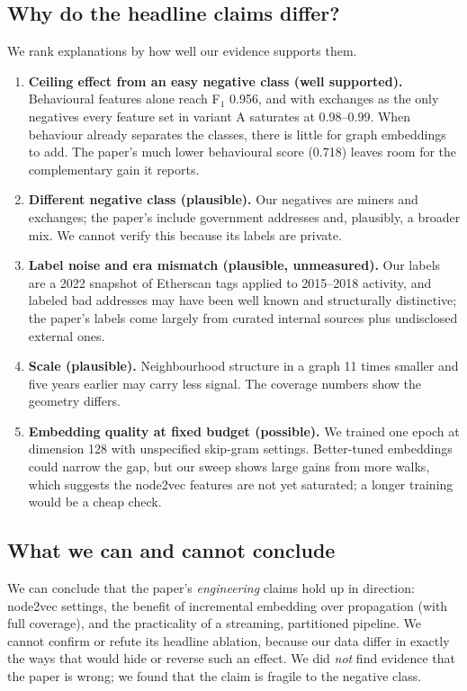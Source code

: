 \documentclass[11pt,a4paper]{article}
\begin{document}
\subsection{Why do the headline claims differ?}
We rank explanations by how well our evidence supports them.
\begin{enumerate}
\item \textbf{Ceiling effect from an easy negative class (well supported).} Behavioural features alone reach F$_1$ 0.956, and with exchanges as the only negatives every feature set in variant A saturates at 0.98--0.99. When behaviour already separates the classes, there is little for graph embeddings to add. The paper's much lower behavioural score (0.718) leaves room for the complementary gain it reports.
\item \textbf{Different negative class (plausible).} Our negatives are miners and exchanges; the paper's include government addresses and, plausibly, a broader mix. We cannot verify this because its labels are private.
\item \textbf{Label noise and era mismatch (plausible, unmeasured).} Our labels are a 2022 snapshot of Etherscan tags applied to 2015--2018 activity, and labeled bad addresses may have been well known and structurally distinctive; the paper's labels come largely from curated internal sources plus undisclosed external ones.
\item \textbf{Scale (plausible).} Neighbourhood structure in a graph 11 times smaller and five years earlier may carry less signal. The coverage numbers show the geometry differs.
\item \textbf{Embedding quality at fixed budget (possible).} We trained one epoch at dimension 128 with unspecified skip-gram settings. Better-tuned embeddings could narrow the gap, but our sweep shows large gains from more walks, which suggests the node2vec features are not yet saturated; a longer training would be a cheap check.
\end{enumerate}

\subsection{What we can and cannot conclude}
We can conclude that the paper's \emph{engineering} claims hold up in direction: node2vec settings, the benefit of incremental embedding over propagation (with full coverage), and the practicality of a streaming, partitioned pipeline. We cannot confirm or refute its headline ablation, because our data differ in exactly the ways that would hide or reverse such an effect. We did \emph{not} find evidence that the paper is wrong; we found that the claim is fragile to the negative class.
\end{document}
